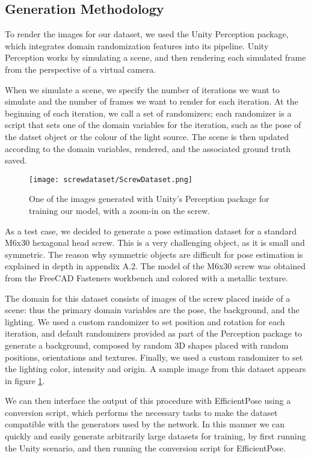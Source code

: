 \subsection{Generation Methodology}
\label{ss:ScrewDataset}

To render the images for our dataset, we used the Unity Perception package\cite{unityPerception}, which integrates domain randomization features into its pipeline. Unity Perception works by simulating a scene, and then rendering each simulated frame from the perspective of a virtual camera. 

When we simulate a scene, we specify the number of iterations we want to simulate and the number of frames we want to render for each iteration. At the beginning of each iteration, we call a set of randomizers; each randomizer is a script that sets one of the domain variables for the iteration, such as the pose of the datset object or the colour of the light source. The scene is then updated according to the domain variables, rendered, and the associated ground truth saved.

\begin{figure}
    \centering
    \texttt{[image: screwdataset/ScrewDataset.png]}
    \caption{One of the images generated with Unity's Perception package for training our model, with a zoom-in on the screw.}
    \label{fig:screwdataset}
\end{figure}

As a test case, we decided to generate a pose estimation dataset for a standard M6x30 hexagonal head screw. This is a very challenging object, as it is small and symmetric. The reason why symmetric objects are difficult for pose estimation is explained in depth in appendix A.2. The model of the M6x30 screw was obtained from the FreeCAD Fasteners workbench\cite{Fasteners} and colored with a metallic texture.

The domain for this dataset consists of images of the screw placed inside of a scene: thus the primary domain variables are the pose, the background, and the lighting. We used a custom randomizer to set position and rotation for each iteration, and default randomizers provided as part of the Perception package to generate a background, composed by random 3D shapes placed with random positions, orientations and textures. Finally, we used a custom randomizer to set the lighting color, intensity and origin. A sample image from this dataset appears in figure \ref{fig:screwdataset}.

We can then interface the output of this procedure with EfficientPose using a conversion script, which performs the necessary tasks to make the dataset compatible with the generators used by the network. In this manner we can quickly and easily generate arbitrarily large datasets for training, by first running the Unity scenario, and then running the conversion script for EfficientPose.

